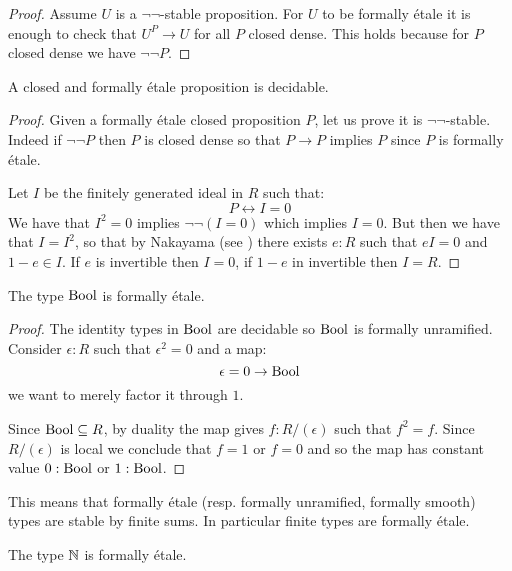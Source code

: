 \begin{proof}
  Assume $U$ is a $\neg\neg$-stable proposition. For $U$ to be formally étale it is enough to check that $U^P\to U$ for all $P$ closed dense. This holds because for $P$ closed dense we have $\neg\neg P$.
  \end{proof}
  
\begin{lemma}\label{closed-and-etale-decidable}
A closed and formally étale proposition is decidable.
\end{lemma} 

\begin{proof}
Given a formally étale closed proposition $P$, let us prove it is $\neg\neg$-stable. Indeed if $\neg\neg P$ then $P$ is closed dense so that $P\to P$ implies $P$ since $P$ is formally étale. 

Let $I$ be the finitely generated ideal in $R$ such that:
\[P\leftrightarrow I=0\]
We have that $I^2=0$ implies $\neg\neg (I=0)$ which implies $I=0$. But then we have that $I=I^2$, so that by Nakayama (see \cite[Lemma II.4.6]{lombardi-quitte}) there exists $e:R$ such that $eI = 0$ and $1-e\in I$. If $e$ is invertible then $I=0$, if $1-e$ in invertible then $I=R$.
\end{proof}

\begin{proposition}\label{bool-is-etale}
  The type $\mathrm{Bool}$ is formally étale.
\end{proposition}

\begin{proof}
The identity types in $\mathrm{Bool}$ are decidable so $\mathrm{Bool}$ is formally unramified. Consider $\epsilon:R$ such that $\epsilon^2=0$ and a map:
\[\epsilon=0 \to \mathrm{Bool}\]
we want to merely factor it through $1$.

 Since $\mathrm{Bool}\subseteq R$, by duality the map gives $f:R/(\epsilon)$ such that $f^2=f$. Since $R/(\epsilon)$ is local we conclude that $f = 1$ or $f=0$ and so the map has constant value $0:\mathrm{Bool}$ or $1:\mathrm{Bool}$.
\end{proof}

\begin{remark}\label{finite-are-etale}
This means that formally étale (resp. formally unramified, formally smooth) types are stable by finite sums. In particular finite types are formally étale.
\end{remark}

\begin{proposition}
The type $\mathbb{N}$ is formally étale.
\end{proposition}

